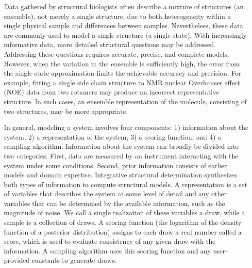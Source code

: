 \documentclass[../../main.tex]{subfiles}
\begin{document}
\begin{refsection}
	Data gathered by structural biologists often describe a mixture of structures (\ie an ensemble), not merely a single structure,
	due to both heterogeneity within a single physical sample and differences between samples.
	Nevertheless, these data are commonly used to model a single structure (\ie a single state).
	With increasingly informative data, more detailed structural questions may be addressed.
	Addressing these questions requires accurate, precise, and complete models.
	However, when the variation in the ensemble is sufficiently high, the error from the single-state approximation limits the achievable accuracy and precision.
	For example, fitting a single side chain structure to NMR nuclear Overhauser effect (NOE) data from two rotamers may produce an incorrect representative structure.
	In such cases, an ensemble representation of the molecule, consisting of two structures, may be more appropriate.

	In general, modeling a system involves four components: 1) information about the system, 2) a representation of the system, 3) a scoring function, and 4) a sampling algorithm.
	Information about the system can broadly be divided into two categories:
	First, data are measured by an instrument interacting with the system under some conditions.
	Second, prior information consists of earlier models and domain expertise.
	Integrative structural determination synthesizes both types of information to compute structural models.
	A representation is a set of variables that describes the system at some level of detail and any other variables that can be determined by the available information, such as the magnitude of noise.
	We call a single realization of these variables a draw, while a sample is a collection of draws.
	A scoring function (\eg the logarithm of the density function of a posterior distribution) assigns to each draw a real number called a score, which is used to evaluate consistency of any given draw with the information.
	A sampling algorithm uses this scoring function and any user-provided constants to generate draws.



\end{refsection}
\end{document}
